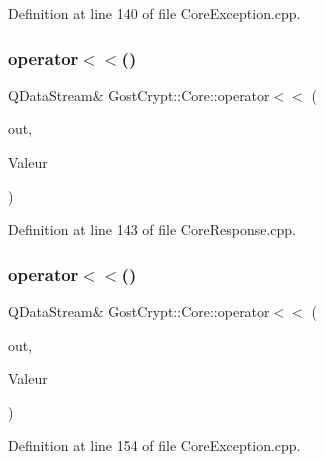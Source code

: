 Definition at line 140 of file Core\+Exception.\+cpp.

\mbox{\label{namespace_gost_crypt_1_1_core_ad2b088c1aa6fe987f0faaaba246c156a}} 
\subsubsection{\texorpdfstring{operator$<$$<$()}{operator<<()}\hspace{0.1cm}{\footnotesize\ttfamily [24/56]}}
{\footnotesize\ttfamily Q\+Data\+Stream\& Gost\+Crypt\+::\+Core\+::operator$<$$<$ (\begin{DoxyParamCaption}\item[{Q\+Data\+Stream \&}]{out,  }\item[{const \hyperlink{struct_gost_crypt_1_1_core_1_1_get_mounted_volumes_response}{Get\+Mounted\+Volumes\+Response} \&}]{Valeur }\end{DoxyParamCaption})}



Definition at line 143 of file Core\+Response.\+cpp.

\mbox{\label{namespace_gost_crypt_1_1_core_a0be254ac1648a96609f144fd0bd020e2}} 
\subsubsection{\texorpdfstring{operator$<$$<$()}{operator<<()}\hspace{0.1cm}{\footnotesize\ttfamily [25/56]}}
{\footnotesize\ttfamily Q\+Data\+Stream\& Gost\+Crypt\+::\+Core\+::operator$<$$<$ (\begin{DoxyParamCaption}\item[{Q\+Data\+Stream \&}]{out,  }\item[{const \hyperlink{class_gost_crypt_1_1_core_1_1_fail_unmount_filesystem}{Gost\+Crypt\+::\+Core\+::\+Fail\+Unmount\+Filesystem} \&}]{Valeur }\end{DoxyParamCaption})}



Definition at line 154 of file Core\+Exception.\+cpp.

